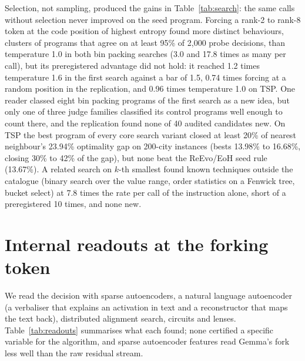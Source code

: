 \documentclass[11pt,letterpaper]{article}
\begin{document}
Selection, not sampling, produced the gains in Table~\ref{tab:search}: the same calls without selection never improved on the seed program. Forcing a rank-2 to rank-8 token at the code position of highest entropy found more distinct behaviours, clusters of programs that agree on at least 95\% of 2,000 probe decisions, than temperature 1.0 in both bin packing searches (3.0 and 17.8 times as many per call), but its preregistered advantage did not hold: it reached 1.2 times temperature 1.6 in the first search against a bar of 1.5, 0.74 times forcing at a random position in the replication, and 0.96 times temperature 1.0 on TSP. One reader classed eight bin packing programs of the first search as a new idea, but only one of three judge families classified its control programs well enough to count there, and the replication found none of 40 audited candidates new. On TSP the best program of every core search variant closed at least 20\% of nearest neighbour's 23.94\% optimality gap on 200-city instances (bests 13.98\% to 16.68\%, closing 30\% to 42\% of the gap), but none beat the ReEvo/EoH seed rule (13.67\%). A related search on $k$-th smallest found known techniques outside the catalogue (binary search over the value range, order statistics on a Fenwick tree, bucket select) at 7.8 times the rate per call of the instruction alone, short of a preregistered 10 times, and none new.

\section{Internal readouts at the forking token}
\label{app:readouts}

We read the decision with sparse autoencoders, a natural language autoencoder (a verbaliser that explains an activation in text and a reconstructor that maps the text back), distributed alignment search, circuits and lenses. Table~\ref{tab:readouts} summarises what each found; none certified a specific variable for the algorithm, and sparse autoencoder features read Gemma's fork less well than the raw residual stream.
\end{document}
